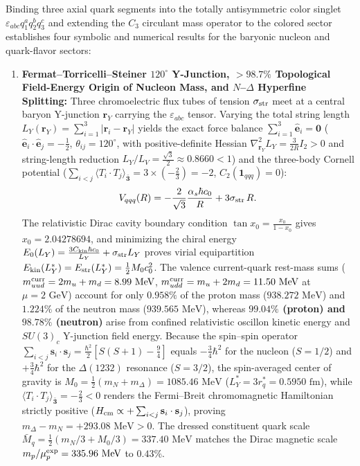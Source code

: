 \documentclass[11pt,a4paper]{article}
\begin{document}
Binding three axial quark segments into the totally antisymmetric color singlet $\varepsilon_{abc}q_1^a q_2^b q_3^c$ and extending the $C_3$ circulant mass operator to the colored sector establishes four symbolic and numerical results for the baryonic nucleon and quark-flavor sectors:
\begin{enumerate}[label=\arabic*.]
\item \textbf{Fermat--Torricelli--Steiner $120^\circ$ Y-Junction, $>98.7\%$ Topological Field-Energy Origin of Nucleon Mass, and $N$--$\Delta$ Hyperfine Splitting:} Three chromoelectric flux tubes of tension $\sigma_{\rm str}$ meet at a central baryon Y-junction $\mathbf{r}_Y$ carrying the $\varepsilon_{abc}$ tensor. Varying the total string length $L_Y(\mathbf{r}_Y) = \sum_{i=1}^3 |\mathbf{r}_i - \mathbf{r}_Y|$ yields the exact force balance $\sum_{i=1}^3 \hat{\mathbf{e}}_i = \mathbf{0}$ ($\hat{\mathbf{e}}_i\cdot\hat{\mathbf{e}}_j = -\frac{1}{2}$, $\theta_{ij} = 120^\circ$, with positive-definite Hessian $\nabla^2_{\mathbf{r}_Y}L_Y = \frac{3}{2R}I_2 > 0$ and string-length reduction $L_Y/L_V = \frac{\sqrt{3}}{2} \approx 0.8660 < 1$) and the three-body Cornell potential ($\sum_{i<j}\langle T_i\cdot T_j\rangle_{\bar{\mathbf{3}}} = 3\times(-\frac{2}{3}) = -2$, $C_2(\mathbf{1}_{qqq}) = 0$):
\begin{equation}
V_{qqq}(R) = -\frac{2}{\sqrt{3}}\frac{\alpha_s \hbar c_0}{R} + 3\sigma_{\rm str}\,R.
\end{equation}
The relativistic Dirac cavity boundary condition $\tan x_0 = \frac{x_0}{1 - x_0}$ gives $x_0 = 2.04278694$, and minimizing the chiral energy $E_0(L_Y) = \frac{3 C_{\rm kin}\hbar c_0}{L_Y} + \sigma_{\rm str}L_Y$ proves virial equipartition $E_{\rm kin}(L_Y^*) = E_{\rm str}(L_Y^*) = \frac{1}{2}M_0 c_0^2$. The valence current-quark rest-mass sums ($m_{uud}^{\rm curr} = 2 m_u + m_d = 8.99\text{ MeV}$, $m_{udd}^{\rm curr} = m_u + 2 m_d = 11.50\text{ MeV}$ at $\mu = 2\text{ GeV}$) account for only \textbf{$0.958\%$} of the proton mass ($938.272\text{ MeV}$) and \textbf{$1.224\%$} of the neutron mass ($939.565\text{ MeV}$), whereas \textbf{$99.04\%$ (proton) and $98.78\%$ (neutron)} arise from confined relativistic oscillon kinetic energy and $SU(3)_c$ Y-junction field energy. Because the spin--spin operator $\sum_{i<j}\mathbf{s}_i\cdot\mathbf{s}_j = \frac{\hbar^2}{2}[S(S+1)-\frac{9}{4}]$ equals $-\frac{3}{4}\hbar^2$ for the nucleon ($S=1/2$) and $+\frac{3}{4}\hbar^2$ for the $\Delta(1232)$ resonance ($S=3/2$), the spin-averaged center of gravity is $M_0 = \frac{1}{2}(m_N + m_\Delta) = 1085.46\text{ MeV}$ ($L_Y^* = 3 r_q^* = 0.5950\text{ fm}$), while $\langle T_i\cdot T_j\rangle_{\bar{\mathbf{3}}} = -\frac{2}{3} < 0$ renders the Fermi--Breit chromomagnetic Hamiltonian strictly positive ($H_{\rm cm} \propto +\sum_{i<j}\mathbf{s}_i\cdot\mathbf{s}_j$), proving $m_\Delta - m_N = +293.08\text{ MeV} > 0$. The dressed constituent quark scale $\bar{M}_q = \frac{1}{2}(m_N/3 + M_0/3) = 337.40\text{ MeV}$ matches the Dirac magnetic scale $m_p/\mu_p^{\rm exp} = 335.96\text{ MeV}$ to \textbf{$0.43\%$}.

\end{enumerate}
\end{document}
